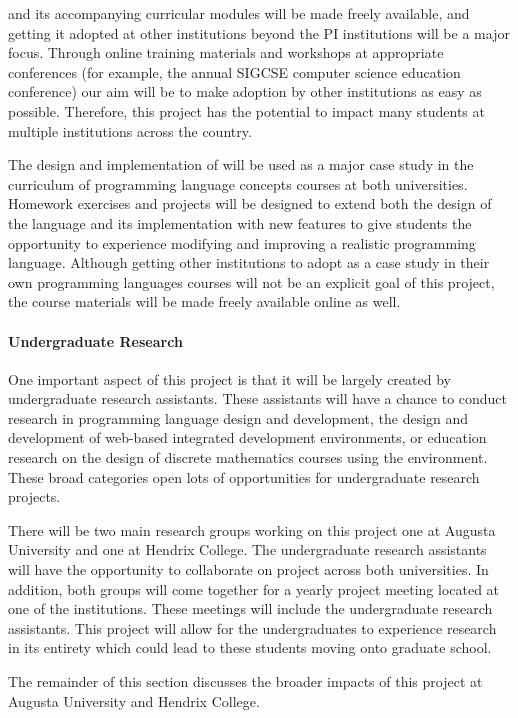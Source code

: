 \thelang and its accompanying curricular modules will be made freely
available, and getting it adopted at other institutions beyond the PI
institutions will be a major focus.  Through online training materials
and workshops at appropriate conferences (for example, the annual
SIGCSE computer science education conference) our aim will be to make
adoption by other institutions as easy as possible.  Therefore, this
project has the potential to impact many students at multiple
institutions across the country.

The design and implementation of \thelang will be used as a major case
study in the curriculum of programming language concepts courses at
both universities.  Homework exercises and projects will be designed
to extend both the design of the language and its implementation with
new features to give students the opportunity to experience modifying
and improving a realistic programming language.  Although getting
other institutions to adopt \thelang as a case study in their own
programming languages courses will not be an explicit goal of this
project, the course materials will be made freely available online as
well.

\paragraph{Undergraduate Research} One important aspect of this project
is that it will be largely created by undergraduate research
assistants.  These assistants will have a chance to conduct research
in programming language design and development, the design and
development of web-based integrated development environments, or
education research on the design of discrete mathematics courses using
the \thelang environment.  These broad categories open lots of
opportunities for undergraduate research projects.

There will be two main research groups working on this project one at
Augusta University and one at Hendrix College.  The undergraduate
research assistants will have the opportunity to collaborate on
project across both universities.  In addition, both groups will come
together for a yearly project meeting located at one of the
institutions.  These meetings will include the undergraduate research
assistants.  This project will allow for the undergraduates to
experience research in its entirety which could lead to these students
moving onto graduate school.

The remainder of this section discusses the broader impacts of this
project at Augusta University and Hendrix College.

